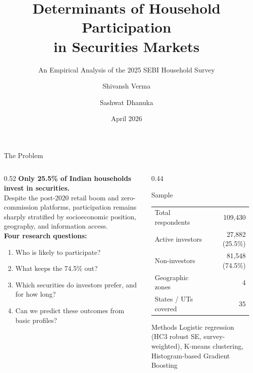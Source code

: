 \documentclass[10pt, aspectratio=169]{beamer}
\title{Determinants of Household Participation\\in Securities Markets}
\subtitle{An Empirical Analysis of the 2025 SEBI Household Survey}
\author{Shivansh Verma \and Sashwat Dhanuka}
\institute{Dept.\ of Computer Science, Ashoka University}
\date{April 2026}
\begin{document}
\maketitle

\begin{frame}{The Problem}
  \begin{columns}[T]
    \begin{column}{0.52\textwidth}
      \textbf{Only 25.5\% of Indian households invest in securities.}\\[0.6em]
      Despite the post-2020 retail boom and zero-commission platforms,
      participation remains sharply stratified by socioeconomic position,
      geography, and information access.\\[0.8em]
      \textbf{Four research questions:}
      \begin{enumerate}
        \item Who is likely to participate?
        \item What keeps the 74.5\% out?
        \item Which securities do investors prefer, and for how long?
        \item Can we predict these outcomes from basic profiles?
      \end{enumerate}
    \end{column}
    \begin{column}{0.44\textwidth}
      \begin{block}{Sample}
        \begin{tabular}{lr}
          Total respondents    & 109,430 \\
          Active investors     & 27,882 (25.5\%) \\
          Non-investors        & 81,548 (74.5\%) \\
          Geographic zones     & 4 \\
          States / UTs covered & 35 \\
        \end{tabular}
      \end{block}
      \vspace{0.4em}
      \begin{block}{Methods}
        Logistic regression (HC3 robust SE, survey-weighted),
        K-means clustering, Histogram-based Gradient Boosting
      \end{block}
    \end{column}
  \end{columns}
\end{frame}
\end{document}
